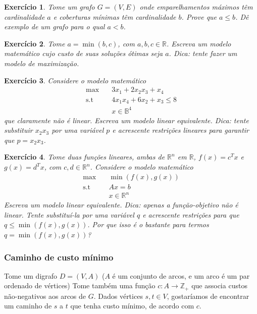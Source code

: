\documentclass[]{article}
\newtheorem{exercicio}{Exercício}
\numberwithin{equation}{section}
\begin{document}
\begin{exercicio}
  Tome um grafo $G = (V, E)$ onde emparelhamentos máximos têm cardinalidade $a$ e coberturas mínimas
  têm cardinalidade $b$.
  Prove que $a \leq b$.
  Dê exemplo de um grafo para o qual $a < b$.
\end{exercicio}

\begin{exercicio}
  Tome $a = \min(b, c)$, com $a, b, c \in \mathbb{R}$. Escreva um modelo matemático cujo custo de
  suas soluções ótimas seja $a$.
  Dica: tente fazer um modelo de maximização.
\end{exercicio}

\begin{exercicio}
  Considere o modelo matemático
  \begin{align}
  \max        &\quad  3x_1 + 2x_2x_3 + x_4 \\
  \text{s.t}  &\quad  4x_1x_4 + 6x_2 + x_3 \leq 8 \\
              &\quad  x \in \mathbb{B}^4
  \end{align}
  que claramente não é linear.
  Escreva um modelo linear equivalente.
  Dica: tente substituir $x_2x_3$ por uma variável $p$ e acrescente restrições lineares para garantir
  que $p = x_2x_3$.
\end{exercicio}

\begin{exercicio}
  Tome duas funções lineares, ambas de $\mathbb{R}^n$ em $\mathbb{R}$, $f(x) = c^Tx$ e $g(x) = d^Tx$, com
  $c, d \in \mathbb{R}^n$. Considere o modelo matemático
  \begin{align}
  \max        &\quad  \min(f(x), g(x)) \\
  \text{s.t}  &\quad  Ax = b \\\
              &\quad  x \in \mathbb{R}^n
  \end{align}
  Escreva um modelo linear equivalente.
  Dica: apenas a função-objetivo não é linear.
  Tente substituí-la por uma variável $q$ e acrescente restrições para que $q \leq \min(f(x), g(x))$.
  Por que isso é o bastante para termos $q = \min(f(x), g(x))$?
\end{exercicio}

\subsubsection{Caminho de custo mínimo}

Tome um digrafo $D = (V, A)$ ($A$ é um conjunto de arcos, e um arco é um par ordenado de vértices)
Tome também uma função $c : A \to \mathbb{Z}_+$ que associa custos não-negativos aos arcos de $G$.
Dados vértices $s, t \in V$, gostaríamos de encontrar um caminho de $s$ a $t$ que tenha custo mínimo,
de acordo com $c$.
\end{document}
